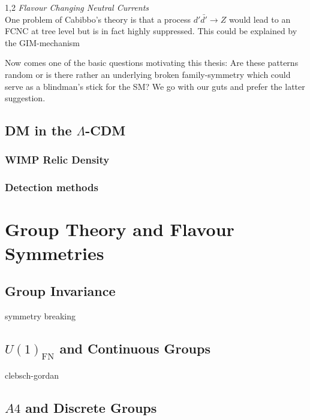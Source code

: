 \documentclass[11pt,a4paper,twoside]{article}
\begin{document}
\begin{spacing}{1,2}
\textit{Flavour Changing Neutral Currents}\\
\noindent
One problem of Cabibbo's theory is that a process $d'\bar {d'} \rightarrow Z$ would lead to an FCNC at tree level but is in fact highly suppressed. This
could be explained by the GIM-mechanism 


Now comes one of the basic questions motivating this thesis: Are these patterns random or is there rather an underlying broken family-symmetry which
could serve as a blindman's stick for the SM? We go with our guts and prefer the latter suggestion.

\subsection{DM in the $\Lambda$-CDM}
\subsubsection{WIMP Relic Density}
\subsubsection{Detection methods}
\section{Group Theory and Flavour Symmetries}
\subsection{Group Invariance}
symmetry breaking
\subsection{$U(1)_\text{FN}$ and Continuous Groups}
\label{sec_FNGT}
clebsch-gordan
\subsection{$A4$ and Discrete Groups}
\label{sec_A4GT}


\end{spacing}
\end{document}
